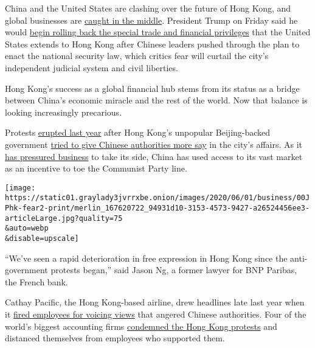 China and the United States are clashing over the future of Hong Kong,
and global businesses are
\href{https://www.nytimes3xbfgragh.onion/2020/05/28/business/hong-kong-special-status-explained.html}{caught
in the middle}. President Trump on Friday said he would
\href{https://www.nytimes3xbfgragh.onion/2020/05/29/us/politics/trump-hong-kong-china-WHO.html?action=click\&module=Top\%20Stories\&pgtype=Homepage}{begin
rolling back the special trade and financial privileges} that the United
States extends to Hong Kong after Chinese leaders pushed through the
plan to enact the national security law, which critics fear will curtail
the city's independent judicial system and civil liberties.

Hong Kong's success as a global financial hub stems from its status as a
bridge between China's economic miracle and the rest of the world. Now
that balance is looking increasingly precarious.

Protests
\href{https://www.nytimes3xbfgragh.onion/2019/06/09/world/asia/hong-kong-extradition-protest.html}{erupted
last year} after Hong Kong's unpopular Beijing-backed government
\href{https://www.nytimes3xbfgragh.onion/2019/06/07/world/asia/hong-kong-china-extradition-protest.html}{tried
to give Chinese authorities more say} in the city's affairs. As it
\href{https://www.nytimes3xbfgragh.onion/2019/06/20/business/hong-kong-business-extradition.html}{has
pressured business} to take its side, China has used access to its vast
market as an incentive to toe the Communist Party line.

\texttt{[image: https://static01.graylady3jvrrxbe.onion/images/2020/06/01/business/00JPhk-fear2-print/merlin\_167620722\_94931d10-3153-4573-9427-a26524456ee3-articleLarge.jpg?quality=75\\\&auto=webp\\\&disable=upscale]}

``We've seen a rapid deterioration in free expression in Hong Kong since
the anti-government protests began,'' said Jason Ng, a former lawyer for
BNP Paribas, the French bank.

Cathay Pacific, the Hong Kong-based airline, drew headlines late last
year when it
\href{https://www.nytimes3xbfgragh.onion/2019/09/11/business/cathay-pacific-hong-kong-protests.html}{fired
employees for voicing views} that angered Chinese authorities. Four of
the world's biggest accounting firms
\href{https://www.nytimes3xbfgragh.onion/2019/08/23/world/asia/hong-kong-protests-accountants.html}{condemned
the Hong Kong protests} and distanced themselves from employees who
supported them.

